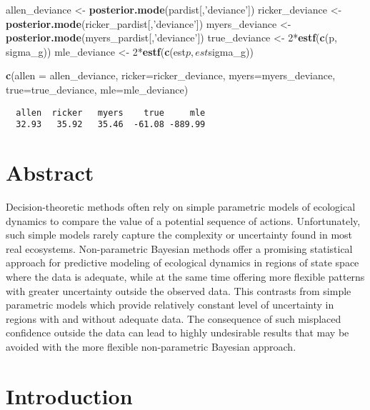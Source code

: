 \documentclass[author-year, review]{elsarticle} %
\newenvironment{Shaded}{}{}
\newcommand{\KeywordTok}[1]{\textcolor[rgb]{0.00,0.44,0.13}{\textbf{{#1}}}}
\newcommand{\DataTypeTok}[1]{\textcolor[rgb]{0.56,0.13,0.00}{{#1}}}
\newcommand{\DecValTok}[1]{\textcolor[rgb]{0.25,0.63,0.44}{{#1}}}
\newcommand{\StringTok}[1]{\textcolor[rgb]{0.25,0.44,0.63}{{#1}}}
\newcommand{\NormalTok}[1]{{#1}}
\begin{document}
\begin{Shaded}
\begin{Highlighting}[]
\NormalTok{allen_deviance <- }\KeywordTok{posterior.mode}\NormalTok{(pardist[,}\StringTok{'deviance'}\NormalTok{])}
\NormalTok{ricker_deviance <- }\KeywordTok{posterior.mode}\NormalTok{(ricker_pardist[,}\StringTok{'deviance'}\NormalTok{])}
\NormalTok{myers_deviance <- }\KeywordTok{posterior.mode}\NormalTok{(myers_pardist[,}\StringTok{'deviance'}\NormalTok{])}
\NormalTok{true_deviance <- }\DecValTok{2}\NormalTok{*}\KeywordTok{estf}\NormalTok{(}\KeywordTok{c}\NormalTok{(p, sigma_g))}
\NormalTok{mle_deviance <- }\DecValTok{2}\NormalTok{*}\KeywordTok{estf}\NormalTok{(}\KeywordTok{c}\NormalTok{(est$p, est$sigma_g))}

\KeywordTok{c}\NormalTok{(}\DataTypeTok{allen =} \NormalTok{allen_deviance, }\DataTypeTok{ricker=}\NormalTok{ricker_deviance, }\DataTypeTok{myers=}\NormalTok{myers_deviance, }\DataTypeTok{true=}\NormalTok{true_deviance, }\DataTypeTok{mle=}\NormalTok{mle_deviance)}
\end{Highlighting}
\end{Shaded}

\begin{verbatim}
  allen  ricker   myers    true     mle 
  32.93   35.92   35.46  -61.08 -889.99 
\end{verbatim}

\section{Abstract}

Decision-theoretic methods often rely on simple parametric models of
ecological dynamics to compare the value of a potential sequence of
actions. Unfortunately, such simple models rarely capture the complexity
or uncertainty found in most real ecosystems. Non-parametric Bayesian
methods offer a promising statistical approach for predictive modeling
of ecological dynamics in regions of state space where the data is
adequate, while at the same time offering more flexible patterns with
greater uncertainty outside the observed data. This contrasts from
simple parametric models which provide relatively constant level of
uncertainty in regions with and without adequate data. The consequence
of such misplaced confidence outside the data can lead to highly
undesirable results that may be avoided with the more flexible
non-parametric Bayesian approach.

\section{Introduction}
\end{document}
